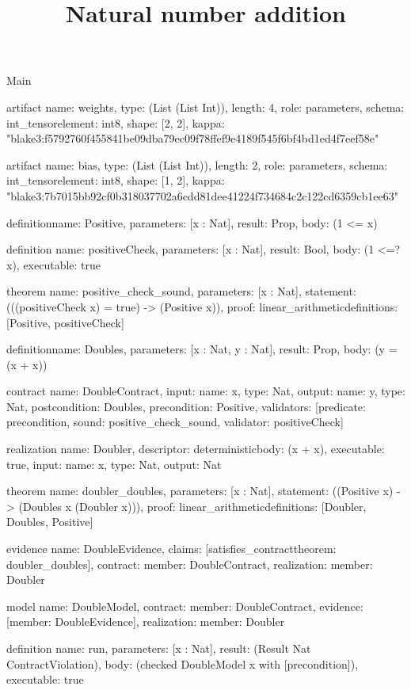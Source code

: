 \begin{lexlean}{Main}
\title{Natural number addition}
\begin{semanticmodule}
artifact{
  name: weights,
  type: (List (List Int)),
  length: 4,
  role: parameters,
  schema: int_tensor{element: int8, shape: [2, 2]},
  kappa: "blake3:f5792760f455841be09dba79ec09f78ffef9e4189f545f6bf4bd1ed4f7eef58e"
}

artifact{
  name: bias,
  type: (List (List Int)),
  length: 2,
  role: parameters,
  schema: int_tensor{element: int8, shape: [1, 2]},
  kappa: "blake3:7b7015bb92cf0b318037702a6cdd81dee41224f734684c2c122cd6359cb1ee63"
}

definition{name: Positive, parameters: [x : Nat], result: Prop, body: (1 <= x)}

definition{
  name: positiveCheck,
  parameters: [x : Nat],
  result: Bool,
  body: (1 <=? x),
  executable: true
}

theorem{
  name: positive_check_sound,
  parameters: [x : Nat],
  statement: (((positiveCheck x) = true) -> (Positive x)),
  proof: linear_arithmetic{definitions: [Positive, positiveCheck]}
}

definition{name: Doubles, parameters: [x : Nat, y : Nat], result: Prop, body: (y = (x + x))}

contract{
  name: DoubleContract,
  input: {name: x, type: Nat},
  output: {name: y, type: Nat},
  postcondition: Doubles,
  precondition: Positive,
  validators: [{predicate: precondition, sound: positive_check_sound, validator: positiveCheck}]
}

realization{
  name: Doubler,
  descriptor: deterministic{body: (x + x)},
  executable: true,
  input: {name: x, type: Nat},
  output: Nat
}

theorem{
  name: doubler_doubles,
  parameters: [x : Nat],
  statement: ((Positive x) -> (Doubles x (Doubler x))),
  proof: linear_arithmetic{definitions: [Doubler, Doubles, Positive]}
}

evidence{
  name: DoubleEvidence,
  claims: [satisfies_contract{theorem: doubler_doubles}],
  contract: {member: DoubleContract},
  realization: {member: Doubler}
}

model{
  name: DoubleModel,
  contract: {member: DoubleContract},
  evidence: [{member: DoubleEvidence}],
  realization: {member: Doubler}
}

definition{
  name: run,
  parameters: [x : Nat],
  result: (Result Nat ContractViolation),
  body: (checked DoubleModel x with [precondition]),
  executable: true
}


\end{semanticmodule}
\end{lexlean}
